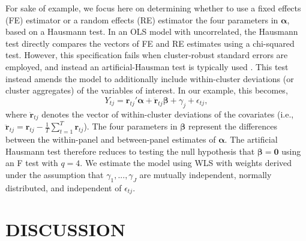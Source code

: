 \documentclass[12pt]{article}
\newcommand{\bm}{\mathbf}
\newcommand{\bs}{\boldsymbol}
\begin{document}
For sake of example, we focus here on determining whether to use a fixed effects (FE) estimator or a random effects (RE) estimator the four parameters in $\bs\alpha$, based on a Hausmann test. In an OLS model with uncorrelated, the Hausmann test directly compares the vectors of FE and RE estimates using a chi-squared test. However, this specification fails when cluster-robust standard errors are employed, and instead an artificial-Hausman test \citep{Arellano1993on} is typically used \citep[pp. 290-291]{Wooldridge2002econometric}. This test instead amends the model to additionally include within-cluster deviations (or cluster aggregates) of the variables of interest. In our example, this becomes,
\begin{equation}
Y_{tj} = \bm{r}_{tj}'\bs\alpha + \bm{\ddot{r}}_{tj}\bs\beta + \gamma_j + \epsilon_{tj},
\end{equation}
where $\bm{\ddot{r}}_{tj}$ denotes the vector of within-cluster deviations of the covariates (i.e., $\bm{\ddot{r}}_{tj} = \bm{r}_{tj} - \frac{1}{T}\sum_{t=1}^T \bm{r}_{tj}$).
The four parameters in $\bs\beta$ represent the differences between the within-panel and between-panel estimates of $\bs\alpha$. The artificial Hausmann test therefore reduces to testing the null hypothesis that $\bs\beta = \bm{0}$ using an F test with $q = 4$. We estimate the model using WLS with weights derived under the assumption that  $\gamma_1,...,\gamma_J$ are mutually independent, normally distributed, and independent of $\epsilon_{tj}$.


\section{DISCUSSION}
\label{sec:discussion}

\end{document}
